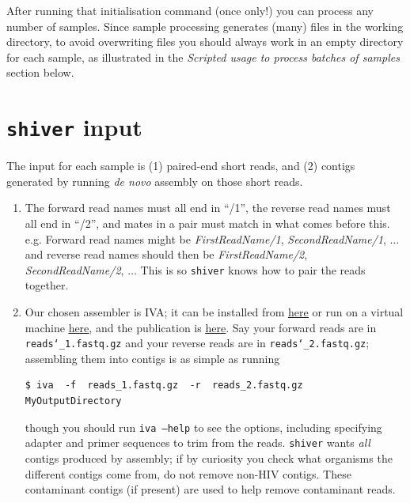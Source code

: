 \documentclass{article}
\newcommand{\shiv}{\texttt{shiver}\xspace}
\let\c\texttt
\newcommand{\www}{\color{blue} \underline}
\begin{document}
After running that initialisation command (once only!) you can process any number of samples.
Since sample processing generates (many) files in the working directory, to avoid overwriting files you should always work in an empty directory for each sample, as illustrated in the {\it Scripted usage to process batches of samples} section below.

\section{\shiv input}
The input for each sample is (1) paired-end short reads, and (2) contigs generated by running {\it de novo} assembly on those short reads.
\begin{enumerate}
\item The forward read names must all end in ``/1'', the reverse read names must all end in ``/2'', and mates in a pair must match in what comes before this.
e.g. Forward read names might be {\it FirstReadName/1}, {\it SecondReadName/1}, $\ldots$ and reverse read names should then be {\it FirstReadName/2}, {\it SecondReadName/2}, $\ldots$ This is so \shiv knows how to pair the reads together.
\item Our chosen assembler is IVA; it can be installed from \href{http://sanger-pathogens.github.io/iva/}{\www{here}} or run on a virtual machine \href{http://sanger-pathogens.github.io/pathogens-vm/}{\www{here}}, and the publication is \href{http://bioinformatics.oxfordjournals.org/content/early/2015/02/27/bioinformatics.btv120.abstract}{\www{here}}.
Say your forward reads are in \c{reads\char`_1.fastq.gz} and your reverse reads are in \c{reads\char`_2.fastq.gz}; assembling them into contigs is as simple as running
\begin{Verbatim}[samepage=true]
$ iva  -f  reads_1.fastq.gz  -r  reads_2.fastq.gz  MyOutputDirectory
\end{Verbatim}
though you should run \c{iva --help} to see the options, including specifying adapter and primer sequences to trim from the reads.
\shiv wants {\it all} contigs produced by assembly; if by curiosity you check what organisms the different contigs come from, do not remove non-HIV contigs.
These contaminant contigs (if present) are used to help remove contaminant reads.

\end{enumerate}
\end{document}
